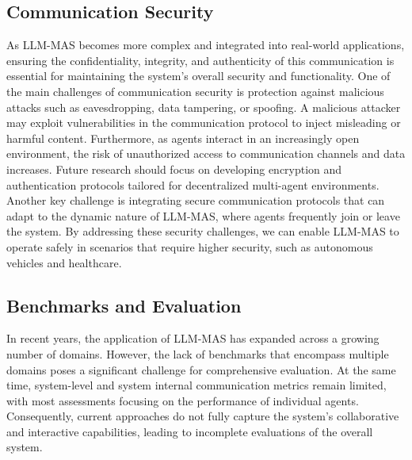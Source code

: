 \subsection{Communication Security}
As LLM-MAS becomes more complex and integrated into real-world applications, ensuring the confidentiality, integrity, and authenticity of this communication is essential for maintaining the system's overall security and functionality. One of the main challenges of communication security is protection against malicious attacks such as eavesdropping, data tampering, or spoofing. A malicious attacker may exploit vulnerabilities in the communication protocol to inject misleading or harmful content. Furthermore, as agents interact in an increasingly open environment, the risk of unauthorized access to communication channels and data increases. Future research should focus on developing encryption and authentication protocols tailored for decentralized multi-agent environments. Another key challenge is integrating secure communication protocols that can adapt to the dynamic nature of LLM-MAS, where agents frequently join or leave the system. By addressing these security challenges, we can enable LLM-MAS to operate safely in scenarios that require higher security, such as autonomous vehicles and healthcare. 
\subsection{Benchmarks and Evaluation}
In recent years, the application of LLM-MAS has expanded across a growing number of domains. However, the lack of benchmarks that encompass multiple domains poses a significant challenge for comprehensive evaluation. At the same time, system-level and system internal communication metrics remain limited, with most assessments focusing on the performance of individual agents. Consequently, current approaches do not fully capture the system’s collaborative and interactive capabilities, leading to incomplete evaluations of the overall system.
